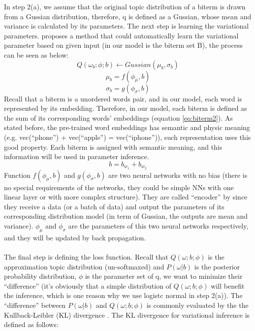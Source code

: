 In step 2(a), we assume that the original topic distribution of a biterm is drawn from a Gussian distribution, therefore, q is defined as a Gussian, whose mean and variance is calculated by its parameters. The next step is learning the variational parameters. \cite{kingma2013auto} proposes a method that could automatically learn the variational parameter based on given input (in our model is the biterm set B), the process can be seen as below:
\begin{equation}
    Q(\omega_b;\phi;b) \leftarrow Gussian(\mu_b,\sigma_b)
\label{eq:var1}
\end{equation}
\begin{equation}
    \mu_b = f(\phi_{\mu}, b)
\label{eq:var2}
\end{equation}
\begin{equation}
    \sigma_b = g(\phi_{\sigma}, b)
\label{eq:var3}
\end{equation}
Recall that a biterm is a unordered words pair, and in our model, each word is represented by its embedding. Therefore, in our model, each biterm is defined as the sum of its corresponding words' embeddings (equation \ref{eq:biterm2}). As stated before, the pre-trained word embeddings has semantic and physic meaning (e.g. vec(``phone'') + vec(``apple'') = vec(``iphone'')), such representation uses this good property. Each biterm is assigned with semantic meaning, and this information will be used in parameter inference.
\begin{equation}
    b = b_{w_1} + b_{w_2}
\label{eq:biterm2}
\end{equation}
Function $f(\phi_{\mu}, b)$ and $g(\phi_{\sigma}, b)$ are two neural networks with no bias (there is no special requirements of the networks, they could be simple NNs with one linear layer or with more complex structure). They are called ``encoder'' by \cite{kingma2013auto} since they receive a data (or a batch of data) and output the parameters of its corresponding distribution model (in term of Gussian, the outputs are mean and variance). $\phi_{\mu}$ and $\phi_{\sigma}$ are the parameters of this two neural networks respectively, and they will be updated by back propagation.\\\\
The final step is defining the loss function. Recall that $Q(\omega;b;\phi)$ is the  approximation topic distribution (un-softmaxed) and $P(\omega|b)$ is the posterior probability distribution, $\phi$ is the parameter set of q, we want to minimize their ``difference'' (it's obviously that a simple distribution of $Q(\omega;b;\phi)$ will benefit the inference, which is one reason why we use logistc normal in step 2(a)). The ``difference'' between $P(\omega|b)$ and $Q(\omega;b;\phi)$ is commonly evaluated by the  the Kullback-Leibler (KL) divergence \cite{yang2017understanding}. The KL divergence for variational inference is defined as follows: 
